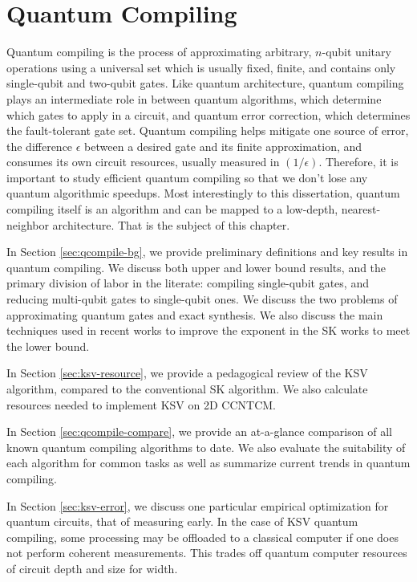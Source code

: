 \chapter{Quantum Compiling}
\label{chap:qcompile}

Quantum compiling is the process of approximating arbitrary,
$n$-qubit unitary operations using a universal set which
is usually fixed, finite, and contains only single-qubit
and two-qubit gates. Like quantum architecture, quantum
compiling plays an intermediate role in between quantum
algorithms, which determine which gates to apply in a circuit,
and quantum error correction, which determines the
fault-tolerant gate set.
Quantum compiling helps mitigate one source of error,
the difference $\epsilon$ between a desired gate and its
finite approximation,
and consumes its own circuit resources, usually measured in
$(1 / \epsilon)$.
Therefore, it is important to study efficient quantum 
compiling so that we don't lose any quantum algorithmic speedups.
Most interestingly to this dissertation, quantum compiling itself
is an algorithm and can be mapped to a low-depth, nearest-neighbor
architecture. That is the subject of this chapter.

In Section \ref{sec:qcompile-bg}, we provide preliminary definitions
and key results in quantum compiling. We discuss both upper
and lower bound results, and the primary division of labor in
the literate: compiling single-qubit gates, and reducing
multi-qubit gates to single-qubit ones. We discuss the
two problems of approximating quantum gates and exact synthesis.
We also discuss the main techniques used in recent works
to improve the exponent in the SK works to meet the lower
bound.

In Section \ref{sec:ksv-resource}, we provide a pedagogical
review of the KSV algorithm, compared to the conventional SK
algorithm. We also calculate resources needed to implement
KSV on 2D CCNTCM.

In Section \ref{sec:qcompile-compare}, we provide an
at-a-glance comparison
of all known quantum compiling algorithms to date.
We also evaluate the suitability of each algorithm
for common tasks as well as summarize current trends
in quantum compiling.


In Section \ref{sec:ksv-error}, we discuss one particular
empirical optimization for quantum circuits, that of measuring
early. In the case of KSV quantum compiling, some
processing may be offloaded to a classical computer if one does
not perform coherent measurements. This trades off quantum
computer resources of circuit depth and size for width.

